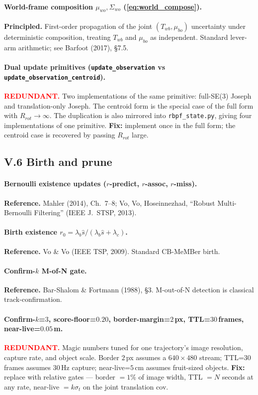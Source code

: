 \documentclass[11pt]{article}
\newcommand{\REDUNDANT}{\textcolor{red}{\textbf{REDUNDANT.}}}
\newcommand{\REFERENCE}{\textbf{Reference.}}
\newcommand{\PRINCIPLED}{\textbf{Principled.}}
\begin{document}
\paragraph{World-frame composition $\mu_{wo},\Sigma_{wo}$
(\eqref{eq:world_compose}).}
\PRINCIPLED{} First-order propagation of the joint
$(T_{wb},\mu_{bo})$ uncertainty under deterministic composition,
treating $T_{wb}$ and $\mu_{bo}$ as independent. Standard lever-arm
arithmetic; see Barfoot (2017), \S 7.5.

\paragraph{Dual update primitives (\texttt{update\_observation} vs
\texttt{update\_observation\_centroid}).}
\REDUNDANT{} Two implementations of the same primitive: full-SE(3)
Joseph and translation-only Joseph. The centroid form is the special
case of the full form with $R_{rot}\to\infty$. The duplication is
also mirrored into \texttt{rbpf\_state.py}, giving four implementations
of one primitive.
\textbf{Fix:} implement once in the full form; the centroid case is
recovered by passing $R_{rot}$ large.

\subsection*{V.6 Birth and prune}

\paragraph{Bernoulli existence updates ($r$-predict, $r$-assoc, $r$-miss).}
\REFERENCE{} Mahler (2014), Ch.~7--8; Vo, Vo, Hoseinnezhad, ``Robust
Multi-Bernoulli Filtering'' (IEEE J.~STSP, 2013).

\paragraph{Birth existence $r_0=\lambda_b\hat s/(\lambda_b\hat s+\lambda_c)$.}
\REFERENCE{} Vo \& Vo (IEEE TSP, 2009). Standard CB-MeMBer birth.

\paragraph{Confirm-$k$ M-of-N gate.}
\REFERENCE{} Bar-Shalom \& Fortmann (1988), \S 3. M-out-of-N
detection is classical track-confirmation.

\paragraph{Confirm-$k$=$3$, score-floor=$0.20$, border-margin=$2$\,px,
TTL=$30$\,frames, near-live=$0.05$\,m.}
\REDUNDANT{} Magic numbers tuned for one trajectory's image
resolution, capture rate, and object scale. Border $2$\,px assumes a
$640\times 480$ stream; TTL=$30$ frames assumes $30$\,Hz capture;
near-live=$5$\,cm assumes fruit-sized objects.
\textbf{Fix:} replace with relative gates --- border $=1\%$ of image
width, TTL $=N$ seconds at any rate, near-live $=k\sigma_t$ on the
joint translation cov.
\end{document}
